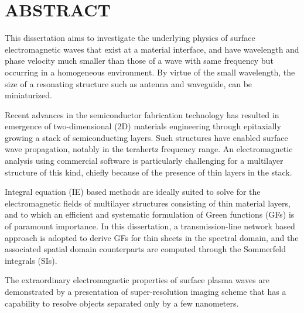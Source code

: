 %
%
%

\chapter*{ABSTRACT}

\pagestyle{plain} %
\setcounter{page}{2}

\indent This dissertation aims to investigate the underlying physics of surface electromagnetic waves that exist at a material interface, and have wavelength and phase velocity much smaller than those of a wave with same frequency but occurring in a homogeneous environment. By virtue of the small wavelength, the size of a resonating structure such as antenna and waveguide, can be miniaturized.

Recent advances in the semiconductor fabrication technology has resulted in emergence of two-dimensional (2D) materials engineering through epitaxially growing a stack of semiconducting layers. Such structures have enabled surface wave propagation, notably in the terahertz frequency range. An electromagnetic analysis using commercial software is particularly challenging for a multilayer structure of this kind, chiefly because of the presence of thin layers in the stack.

Integral equation (IE) based methods are ideally suited to solve for the electromagnetic fields of multilayer structures consisting of thin material layers, and to which an efficient and systematic formulation of Green functions (GFs) is of paramount importance. In this dissertation, a transmission-line network based approach is adopted to derive GFs for thin sheets in the spectral domain, and the associated spatial domain counterparts are computed through the Sommerfeld integrals (SIs).

The extraordinary electromagnetic properties of surface plasma waves are demonstrated by a presentation of super-resolution imaging scheme that has a capability to resolve objects separated only by a few nanometers.

\pagebreak{}
